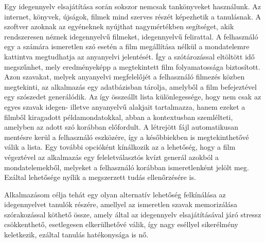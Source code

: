 Egy idegennyelv elsajátítása során sokszor nemcsak tankönyveket használunk. Az internet, könyvek, újságok, filmek mind szerves részét képezhetik a tanulásnak. A szoftver azoknak az egyéneknek nyújthat nagymértékben segítséget, akik rendszeresen néznek idegennyelvű filmeket, idegennyelvű felirattal. A felhasználó egy a számára ismeretlen szó esetén a film megállítása nélkül a mondatelemre kattintva megtudhatja az anyanyelvi jelentését. Így a szótározással eltöltött idő megszűnhet, mely eredményeképp a megtekintett film folyamatossága biztosított. Azon szavakat, melyek anyanyelvi megfelelőjét a felhasználó filmezés közben megtekinti, az alkalmazás egy adatbázisban tárolja, amelyből a film befejeztével egy szószedet generálódik. Az így összeállt lista különlegessége, hogy nem csak az egyes szavak idegen- illetve anyanyelvű alakjait tartalmazza, hanem ezeket a filmből kiragadott példamondatokkal, abban a kontextusban szemlélteti, amelyben az adott szó korábban előfordult. A létrejött fájl automatikusan mentésre kerül a felhasználó eszközére, így a későbbiekben is megtekinthetővé válik a lista. Egy további opcióként kínálkozik az a lehetőség, hogy a film végeztével az alkalmazás egy feleletválasztós kvízt generál azokból a mondatelemekből, melyeket a felhasználó korábban ismeretlenként jelölt meg. Ezáltal lehetősége nyílik a megszerzett tudás ellenőrzésére is.

Alkalmazásom célja tehát egy olyan alternatív lehetőség felkínálása az idegennyelvet tanulók részére, amellyel az ismeretlen szavak memorizálása szórakozással köthető össze, amely által az idegennyelv elsajátításával járó stressz csökkenthető, esetlegesen elkerülhetővé válik, így nagy eséllyel sikerélmény keletkezik, ezáltal tanulás hatékonysága is nő.
